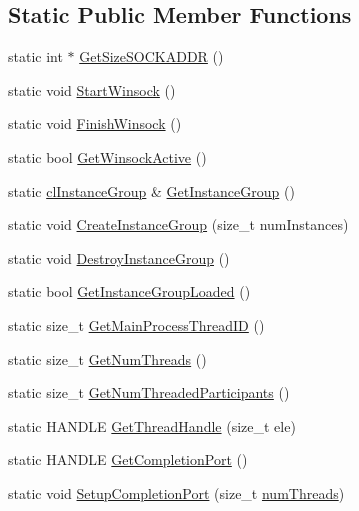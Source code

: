 \subsection*{Static Public Member Functions}
\begin{DoxyCompactItemize}
\item 
static int $\ast$ \hyperlink{classcl_networking_utility_a355129677d3e58b290597f3988ceda8d}{GetSizeSOCKADDR} ()
\item 
static void \hyperlink{classcl_networking_utility_a7d5ae3406c401acd827caae8119e94e5}{StartWinsock} ()
\item 
static void \hyperlink{classcl_networking_utility_a61e79d1b69edccb69a03fc6837766571}{FinishWinsock} ()
\item 
static bool \hyperlink{classcl_networking_utility_aec5ada18202ac3876a006abbf165eaf8}{GetWinsockActive} ()
\item 
static \hyperlink{classcl_instance_group}{clInstanceGroup} \& \hyperlink{classcl_networking_utility_a386cafe64680bc6237ec6fa4f2c9411c}{GetInstanceGroup} ()
\item 
static void \hyperlink{classcl_networking_utility_a70199957950e7a9e01dc9a41a8375cbe}{CreateInstanceGroup} (size\_\-t numInstances)
\item 
static void \hyperlink{classcl_networking_utility_ad4bf8197e1f617f02b464a4553a7b65b}{DestroyInstanceGroup} ()
\item 
static bool \hyperlink{classcl_networking_utility_a68e9baab5e2dbec15241fe3c8b676300}{GetInstanceGroupLoaded} ()
\item 
static size\_\-t \hyperlink{classcl_networking_utility_acb6168b9acdc70baeb9bc0fe7c5196bb}{GetMainProcessThreadID} ()
\item 
static size\_\-t \hyperlink{classcl_networking_utility_a070960e0d88aa8a5313c1d09c57fed1b}{GetNumThreads} ()
\item 
static size\_\-t \hyperlink{classcl_networking_utility_a19cbaaea7a9595185cb9c01bb1b438b5}{GetNumThreadedParticipants} ()
\item 
static HANDLE \hyperlink{classcl_networking_utility_aabad1cb545d70de2ef1a4eb32b09a648}{GetThreadHandle} (size\_\-t ele)
\item 
static HANDLE \hyperlink{classcl_networking_utility_a670abdc0d4f68ea2250342230a5e9e06}{GetCompletionPort} ()
\item 
static void \hyperlink{classcl_networking_utility_a335aaa6c74fae074217678368e10dbda}{SetupCompletionPort} (size\_\-t \hyperlink{classcl_networking_utility_a7f033e0caca77ee312fad6b54c224dad}{numThreads})

\end{DoxyCompactItemize}
